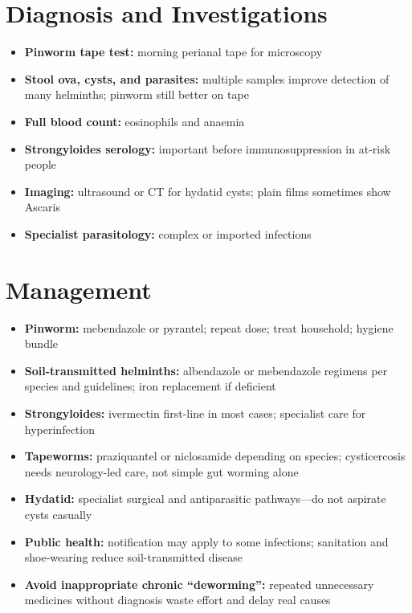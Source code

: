 \section*{Diagnosis and Investigations}
\begin{itemize}
    \item \textbf{Pinworm tape test:} morning perianal tape for microscopy
    \item \textbf{Stool ova, cysts, and parasites:} multiple samples improve detection of many helminths; pinworm still better on tape
    \item \textbf{Full blood count:} eosinophils and anaemia
    \item \textbf{Strongyloides serology:} important before immunosuppression in at-risk people
    \item \textbf{Imaging:} ultrasound or CT for hydatid cysts; plain films sometimes show Ascaris
    \item \textbf{Specialist parasitology:} complex or imported infections
\end{itemize}

\section*{Management}
\begin{itemize}
    \item \textbf{Pinworm:} mebendazole or pyrantel; repeat dose; treat household; hygiene bundle
    \item \textbf{Soil-transmitted helminths:} albendazole or mebendazole regimens per species and guidelines; iron replacement if deficient
    \item \textbf{Strongyloides:} ivermectin first-line in most cases; specialist care for hyperinfection
    \item \textbf{Tapeworms:} praziquantel or niclosamide depending on species; cysticercosis needs neurology-led care, not simple gut worming alone
    \item \textbf{Hydatid:} specialist surgical and antiparasitic pathways---do not aspirate cysts casually
    \item \textbf{Public health:} notification may apply to some infections; sanitation and shoe-wearing reduce soil-transmitted disease
    \item \textbf{Avoid inappropriate chronic ``deworming'':} repeated unnecessary medicines without diagnosis waste effort and delay real causes
\end{itemize}

